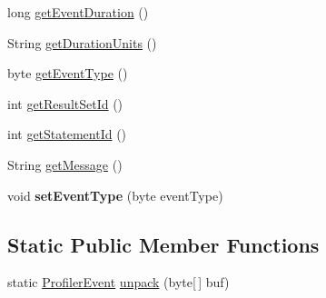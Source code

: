 \begin{DoxyCompactItemize}
\item 
long \mbox{\hyperlink{classcom_1_1mysql_1_1cj_1_1log_1_1_profiler_event_impl_a52efd224f93dd9a3238995df02e4f330}{get\+Event\+Duration}} ()
\item 
String \mbox{\hyperlink{classcom_1_1mysql_1_1cj_1_1log_1_1_profiler_event_impl_a412e4b084f1c75d2ce0043bef41c2647}{get\+Duration\+Units}} ()
\item 
byte \mbox{\hyperlink{classcom_1_1mysql_1_1cj_1_1log_1_1_profiler_event_impl_a617ef1b80526a6401966ce38ad320872}{get\+Event\+Type}} ()
\item 
int \mbox{\hyperlink{classcom_1_1mysql_1_1cj_1_1log_1_1_profiler_event_impl_a2b432bffc0257f4825222bb9946a44ba}{get\+Result\+Set\+Id}} ()
\item 
int \mbox{\hyperlink{classcom_1_1mysql_1_1cj_1_1log_1_1_profiler_event_impl_a3a30e724b4b86369376e1a7402f16d66}{get\+Statement\+Id}} ()
\item 
String \mbox{\hyperlink{classcom_1_1mysql_1_1cj_1_1log_1_1_profiler_event_impl_aea930b7a299a44946aea7544c5df2a7d}{get\+Message}} ()
\item 
\mbox{\label{classcom_1_1mysql_1_1cj_1_1log_1_1_profiler_event_impl_a1326d8fa5e3acbe79a145469f7316843}} 
void {\bfseries set\+Event\+Type} (byte event\+Type)
\end{DoxyCompactItemize}
\subsection*{Static Public Member Functions}
\begin{DoxyCompactItemize}
\item 
static \mbox{\hyperlink{interfacecom_1_1mysql_1_1cj_1_1log_1_1_profiler_event}{Profiler\+Event}} \mbox{\hyperlink{classcom_1_1mysql_1_1cj_1_1log_1_1_profiler_event_impl_aba1059ef66f8246a1e69d24af53dc9f0}{unpack}} (byte\mbox{[}$\,$\mbox{]} buf)
\end{DoxyCompactItemize}

